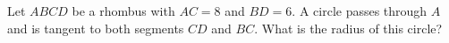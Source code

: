 Let $ABCD$ be a rhombus with $AC=8$ and $BD=6$. A circle passes through $A$ and is tangent to both segments $CD$ and $BC$. What is the radius of this circle?
